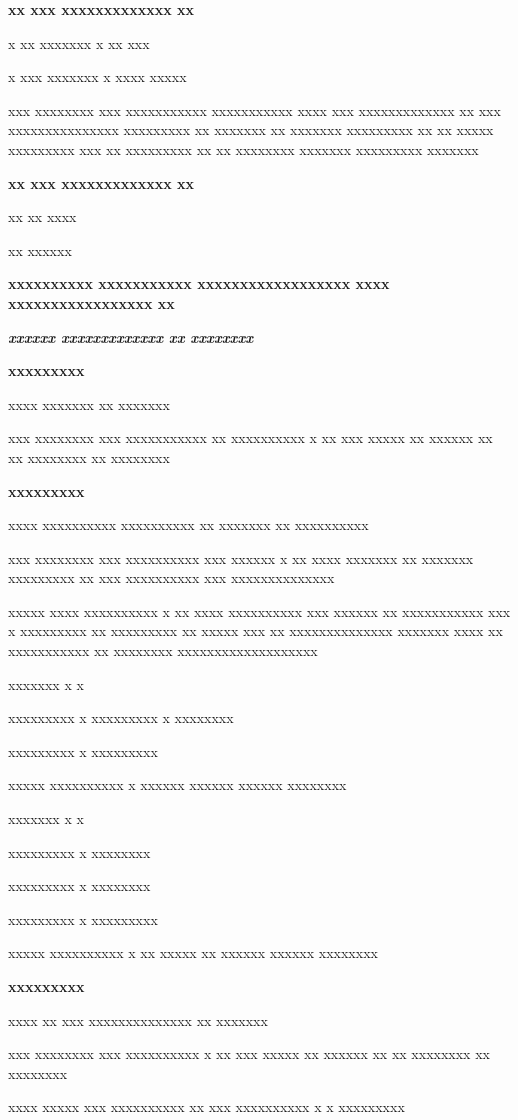 \documentclass[11pt,a4paper]{article}
\begin{document}
\textbf{xx xxx xxxxxxxxxxxxx xx}

x xx xxxxxxx	              x xx xxx

x xxx xxxxxxx                     x xxxx xxxxx

xxx xxxxxxxx xxx xxxxxxxxxxx xxxxxxxxxxx xxxx xxx xxxxxxxxxxxxx xx xxx xxxxxxxxxxxxxxx xxxxxxxxx xx xxxxxxx xx xxxxxxx xxxxxxxxx xx xx xxxxx xxxxxxxxx xxx xx xxxxxxxxx xx xx xxxxxxxx xxxxxxx xxxxxxxxx xxxxxxx

\textbf{xx xxx xxxxxxxxxxxxx xx}

xx xx xxxx

xx xxxxxx

\textbf{xxxxxxxxxx xxxxxxxxxxx xxxxxxxxxxxxxxxxxx xxxx xxxxxxxxxxxxxxxxx xx}

\textit{\textbf{xxxxxx xxxxxxxxxxxxx xx xxxxxxxx}}

\textbf{xxxxxxxxx}

xxxx xxxxxxx xx xxxxxxx

xxx xxxxxxxx xxx xxxxxxxxxxx xx xxxxxxxxxx x xx xxx xxxxx xx xxxxxx xx xx xxxxxxxx xx xxxxxxxx

\textbf{xxxxxxxxx}

xxxx xxxxxxxxxx xxxxxxxxxx xx xxxxxxx xx xxxxxxxxxx

xxx xxxxxxxx xxx xxxxxxxxxx xxx xxxxxx x xx xxxx xxxxxxx xx xxxxxxx xxxxxxxxx xx xxx xxxxxxxxxx xxx xxxxxxxxxxxxxx

xxxxx xxxx xxxxxxxxxx x xx xxxx xxxxxxxxxx xxx xxxxxx xx xxxxxxxxxxx xxx x xxxxxxxxx xx xxxxxxxxx xx xxxxx xxx xx xxxxxxxxxxxxxx xxxxxxx xxxx xx xxxxxxxxxxx xx xxxxxxxx xxxxxxxxxxxxxxxxxxx

xxxxxxx x x

xxxxxxxxx x xxxxxxxxx x xxxxxxxx

xxxxxxxxx x xxxxxxxxx

xxxxx xxxxxxxxxx x xxxxxx xxxxxx xxxxxx xxxxxxxx

xxxxxxx x x

xxxxxxxxx x xxxxxxxx

xxxxxxxxx x xxxxxxxx

xxxxxxxxx x xxxxxxxxx

xxxxx xxxxxxxxxx x xx xxxxx xx xxxxxx xxxxxx xxxxxxxx

\textbf{xxxxxxxxx}

xxxx xx xxx xxxxxxxxxxxxxx xx xxxxxxx

xxx xxxxxxxx xxx xxxxxxxxxx x xx xxx xxxxx xx xxxxxx xx xx xxxxxxxx xx xxxxxxxx

xxxx xxxxx xxx xxxxxxxxxx xx xxx xxxxxxxxxx x x xxxxxxxxx
\end{document}
